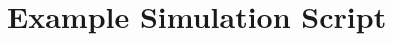 \chapter{Example Simulation Script} \label{sec:script}

\begin{figure}
  \scriptsize
  
\end{figure}
